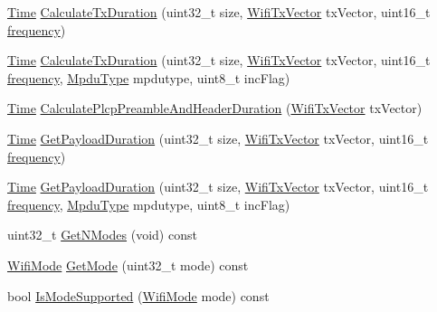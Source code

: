 \begin{DoxyCompactItemize}
\item 
\hyperlink{classns3_1_1Time}{Time} \hyperlink{classns3_1_1WifiPhy_aee98c7241bb4f0bb8e6d90f5771dacc7}{Calculate\+Tx\+Duration} (uint32\+\_\+t size, \hyperlink{classns3_1_1WifiTxVector}{Wifi\+Tx\+Vector} tx\+Vector, uint16\+\_\+t \hyperlink{mmwave_2model_2fading-traces_2fading__trace__generator_8m_a09045328d6d7e16aa4013f526cc6993d}{frequency})
\item 
\hyperlink{classns3_1_1Time}{Time} \hyperlink{classns3_1_1WifiPhy_a979c285c4cbabcdadfa63162fb53843d}{Calculate\+Tx\+Duration} (uint32\+\_\+t size, \hyperlink{classns3_1_1WifiTxVector}{Wifi\+Tx\+Vector} tx\+Vector, uint16\+\_\+t \hyperlink{mmwave_2model_2fading-traces_2fading__trace__generator_8m_a09045328d6d7e16aa4013f526cc6993d}{frequency}, \hyperlink{namespacens3_ae617d41bbd0c07fa58ee2306f687b055}{Mpdu\+Type} mpdutype, uint8\+\_\+t inc\+Flag)
\item 
\hyperlink{classns3_1_1Time}{Time} \hyperlink{classns3_1_1WifiPhy_ac308f6020523524aaf1feb20565ce339}{Calculate\+Plcp\+Preamble\+And\+Header\+Duration} (\hyperlink{classns3_1_1WifiTxVector}{Wifi\+Tx\+Vector} tx\+Vector)
\item 
\hyperlink{classns3_1_1Time}{Time} \hyperlink{classns3_1_1WifiPhy_a905bac41f7337da26788a2bbb971d3fa}{Get\+Payload\+Duration} (uint32\+\_\+t size, \hyperlink{classns3_1_1WifiTxVector}{Wifi\+Tx\+Vector} tx\+Vector, uint16\+\_\+t \hyperlink{mmwave_2model_2fading-traces_2fading__trace__generator_8m_a09045328d6d7e16aa4013f526cc6993d}{frequency})
\item 
\hyperlink{classns3_1_1Time}{Time} \hyperlink{classns3_1_1WifiPhy_a7573ab7a26df41afb80a8c285cf290ee}{Get\+Payload\+Duration} (uint32\+\_\+t size, \hyperlink{classns3_1_1WifiTxVector}{Wifi\+Tx\+Vector} tx\+Vector, uint16\+\_\+t \hyperlink{mmwave_2model_2fading-traces_2fading__trace__generator_8m_a09045328d6d7e16aa4013f526cc6993d}{frequency}, \hyperlink{namespacens3_ae617d41bbd0c07fa58ee2306f687b055}{Mpdu\+Type} mpdutype, uint8\+\_\+t inc\+Flag)
\item 
uint32\+\_\+t \hyperlink{classns3_1_1WifiPhy_a2467e56b69d64bb2d648302f39397317}{Get\+N\+Modes} (void) const 
\item 
\hyperlink{classns3_1_1WifiMode}{Wifi\+Mode} \hyperlink{classns3_1_1WifiPhy_ac35983a13a769a7fbaac43340b8cdaf2}{Get\+Mode} (uint32\+\_\+t mode) const 
\item 
bool \hyperlink{classns3_1_1WifiPhy_aed92380ac38a299687f08ab142f5bba3}{Is\+Mode\+Supported} (\hyperlink{classns3_1_1WifiMode}{Wifi\+Mode} mode) const 
\item 

\end{DoxyCompactItemize}
